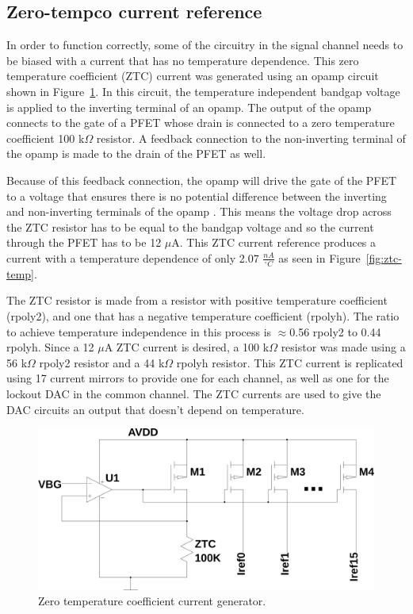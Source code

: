 \documentclass[12pt,oneside,final]{siuethesis}
\theoremstyle{definition}
\begin{document}
\subsection{Zero-tempco current reference}
\par In order to function correctly, some of the circuitry in the signal channel needs to be biased with a current that has no temperature dependence. This zero temperature coefficient (ZTC) current was generated using an opamp circuit shown in Figure~\ref{fig:ztc}. In this circuit, the temperature independent bandgap voltage is applied to the inverting terminal of an opamp. The output of the opamp connects to the gate of a PFET whose drain is connected to a zero temperature coefficient 100 k$\Omega$ resistor. A feedback connection to the non-inverting terminal of the opamp is made to the drain of the PFET as well. 
\par Because of this feedback connection, the opamp will drive the gate of the PFET to a voltage that ensures there is no potential difference between the inverting and non-inverting terminals of the opamp \cite{BAKER}. This means the voltage drop across the ZTC resistor has to be equal to the bandgap voltage and so the current through the PFET has to be 12 $\mu$A. This ZTC current reference produces a current with a temperature dependence of only 2.07 $\frac{nA}{^{\circ}C}$ as seen in Figure~\ref{fig:ztc-temp}.
\par The ZTC resistor is made from a resistor with positive temperature coefficient (rpoly2), and one that has a negative temperature coefficient (rpolyh). The ratio to achieve temperature independence in this process is $\approx$0.56 rpoly2 to 0.44 rpolyh. Since a 12 $\mu$A ZTC current is desired, a 100 k$\Omega$ resistor was made using a 56 k$\Omega$ rpoly2 resistor and a 44 k$\Omega$ rpolyh resistor. This ZTC current is replicated using 17 current mirrors to provide one for each channel, as well as one for the lockout DAC in the common channel. The ZTC currents are used to give the DAC circuits an output that doesn't depend on temperature.
\begin{figure}[htbp!]
\centering
\includegraphics[scale=.36,keepaspectratio=true]{../LTspice_Drawings/ztc_iref/circuit.png} 
\caption{Zero temperature coefficient current generator.}
\label{fig:ztc}
\end{figure}
\end{document}
